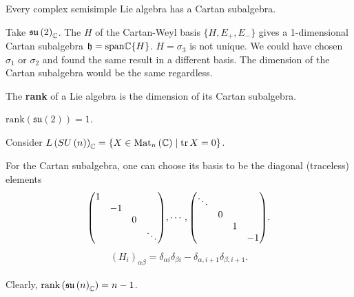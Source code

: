 \begin{proposition}
    Every complex semisimple Lie algebra has a Cartan subalgebra.
\end{proposition}

\begin{example}
    Take $\mathfrak{su}\left( 2 \right)_{\mathbb{C}}$. The $H$ of the Cartan-Weyl basis $\{H, E_+, E_-\} $ gives a 1-dimensional Cartan subalgebra $\mathfrak{h} = \text{span}{\ensuremath{\mathbb{C}}} \{H\} $. $H = \sigma_3$ is not unique. We could have chosen $\sigma_1$ or $\sigma_2$ and found the same result in a different basis. The dimension of the Cartan subalgebra would be the same regardless.
\end{example}

\begin{definition}
    The \textbf{rank} of a Lie algebra is the dimension of its Cartan subalgebra.
\end{definition}

\begin{example}
    $\text{rank}\left( \mathfrak{su}\left( 2 \right)  \right) = 1$.
\end{example}

\begin{example}
    Consider $L \left( SU \left( n \right)  \right)_{\mathbb{C}} = \{X \in \text{Mat}_n \left( \mathbb{C} \right)  \mid \tr X = 0\}$.
\end{example}

For the Cartan subalgebra, one can choose its basis to be the diagonal (traceless) elements
\begin{align}
    \mqty( 1 & & & \\ & -1 & & \\ & & 0 &\\ & & &\ddots ) , \cdots, \mqty( \ddots & & & \\ & 0 & & \\ &  &1 & \\ & && -1 )
.\end{align}
\begin{align}
    \left( H_i \right)_{\alpha \beta} = \delta_{\alpha i} \delta_{\beta i} - \delta_{\alpha , i + 1} \delta_{\beta , i + 1}
.\end{align}

Clearly, $\text{rank} \left( \mathfrak{su}\left( n \right)_{\mathbb{C}} \right) = n - 1$.
